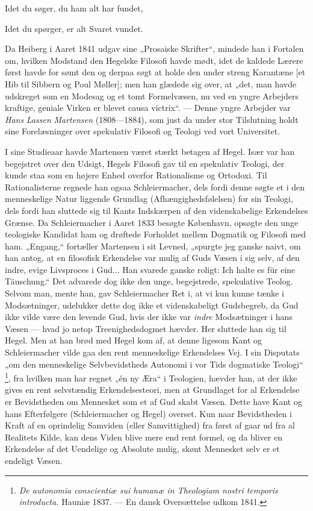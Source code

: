 \documentclass[12pt,a4paper,openany]{book}
\newcommand{\opage}[1]{\marginnote{\footnotesize\textit{[#1]}}}
\begin{document}
Idet du søger, du ham alt har fundet,

Idet du spørger, er alt Svaret vundet.

Da Heiberg i Aaret 1841 udgav sine „Prosaiske Skrifter“, mindede han i Fortalen
om, hvilken Modstand den Hegelske Filosofi havde mødt, idet de kaldede Lærere
først havde for%
\setcounter{footnote}{0}%
\opage{137}sømt den og derpaa søgt at holde den under streng Karantæne [et Hib
til Sibbern og Poul Møller]; men han glædede sig over, at „det, man havde
udskreget som en Modesag og et tomt Formelvæsen, nu ved en yngre Arbejders
kraftige, geniale Virken er blevet causa victrix“. --- Denne yngre Arbejder var
\emph{Hans} \emph{Lassen} \emph{Martensen} (1808---1884), som just da under
stor Tilslutning holdt sine Forelæsninger over spekulativ Filosofi og Teologi
ved vort Universitet.

I sine Studieaar havde Martensen været stærkt betagen af Hegel. Især var han
begejstret over den Udsigt, Hegels Filosofi gav til en spekulativ Teologi, der
kunde staa som en højere Enhed overfor Rationalisme og Ortodoxi. Til
Rationalisterne regnede han ogsaa Schleiermacher, dels fordi denne søgte et i
den menneskelige Natur liggende Grundlag (Afhængighedsfølelsen) for sin
Teologi, dels fordi han sluttede sig til Kants Indskærpen af den videnskabelige
Erkendelses Grænse. Da Schleiermacher i Aaret 1833 besøgte København, opsøgte
den unge teologiske Kandidat ham og drøftede Forholdet mellem Dogmatik og
Filosofi med ham. „Engang,“ fortæller Martensen i sit Levned, „spurgte jeg
ganske naivt, om han antog, at en filosofisk Erkendelse var mulig af Guds Væsen
i sig selv, af den indre, evige Livsproces i Gud... Han svarede ganske roligt:
Ich halte es für eine Täuschung.“ Det advarede dog ikke den unge, begejstrede,
spekulative Teolog. Selvom man, mente han, gav Schleiermacher Ret i, at vi kun
kunne tænke i Modsætninger, udelukker dette dog ikke et videnskabeligt
Gudsbegreb, da Gud ikke vilde være den levende Gud, hvis der ikke var
\textit{indre} Modsætninger i hans Væsen --- hvad jo netop Treenighedsdogmet
hævder. Her sluttede han sig til Hegel. Men at han brød med Hegel kom af, at
denne ligesom Kant og Schleiermacher vilde gaa den rent menneskelige
Erkendelses Vej. I sin Disputats „om den menneskelige Selvbevidstheds Autonomi
i vor Tids dogmatiske Teologi“%
\footnote[1]{\textit{De autonomia conscientiæ sui humanæ in Theologiam nostri
temporis introducta.} Hauniæ 1837. --- En dansk Oversættelse udkom 1841.}, fra
hvilken man har regnet „én ny Æra“ i Teologien, hævder han, at der ikke gives
en rent selvstændig
\setcounter{footnote}{0}%
\opage{138}Erkendelsesteori, men at Grundlaget for al Erkendelse er
Bevidstheden om Mennesket som et af Gud skabt Væsen. Dette have Kant og hans
Efterfølgere (Schleiermacher og Hegel) overset. Kun naar Bevidstheden i Kraft
af en oprindelig Samviden (eller Samvittighed) fra først af gaar ud fra al
Realitets Kilde, kan dens Viden blive mere end rent formel, og da bliver en
Erkendelse af det Uendelige og Absolute mulig, skønt Mennesket selv er et
endeligt Væsen.
\end{document}

